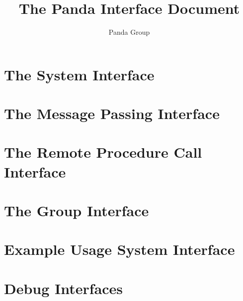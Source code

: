 
\title{The Panda Interface Document}
\author{Panda Group}



\maketitle

\chapter{The System Interface}
\label{cha:system}




\chapter{The Message Passing Interface}
\label{cha:mp}



\chapter{The Remote Procedure Call Interface}
\label{cha:rpc}


\chapter{The Group Interface}
\label{cha:group}


\appendix
\chapter{Example Usage System Interface}


\chapter{Debug Interfaces}



